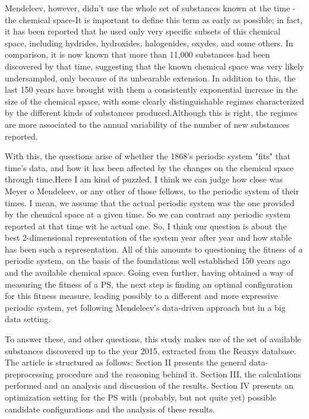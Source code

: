 \documentclass[]{article}
\newcommand{\gr}[1]{{\color{red}#1}}
\begin{document}
Mendeleev, however, didn't use the whole set of substances known at the time -the chemical space-\gr{It is important to define this term as early as possible}; in fact, it has been reported that he used only very specific subsets of this chemical space, including hydrides, hydroxides, halogenides, oxydes, and some others. In comparison, it is now known that more than 11,000 substances had been discovered by that time, suggesting that the known chemical space was very likely undersampled, only because of its unbearable extension. In addition to this, the last 150 years have brought with them a consistently exponential increase in the size of the chemical space, with some clearly distinguishable regimes characterized by the different kinds of substances produced.\gr{Although this is right, the regimes are more associated to the annual variability of the number of new substances reported.}

With this, the questions arise of whether the 1868's periodic system "fits" that time's data, and how it has been affected by the changes on the chemical space through time.\gr{Here I am kind of puzzled.  I think we can judge how close was Meyer o Mendeleev, or any other of those fellows, to the periodic system of their times.  I mean, we assume that the actual periodic system was the one provided by the chemical space at a given time.  So we can contrast any periodic system reported at that time wit he actual one.  So, I think our question is about the best 2-dimensional representation of the system year after year and how stable has been such a representation.} All of this amounts to questioning the fitness of \textit{a} periodic system, on the basis of the foundations well established 150 years ago and the available chemical space. Going even further, having obtained a way of measuring the fitness of a PS, the next step is finding an optimal configuration for this fitness measure, leading possibly to a different and more expressive periodic system, yet following Mendeleev's data-driven approach but in a big data setting.

To answer these, and other questions, this study makes use of the set of available substances discovered up to the year 2015, extracted from the Reaxys database. The article is structured as follows: Section II presents the general data-preprocessing procedure and the reasoning behind it. Section III, the calculations performed and an analysis and discussion of the results. Section IV presents an optimization setting for the PS with (probably, but not quite yet) possible candidate configurations and the analysis of these results.
\end{document}
